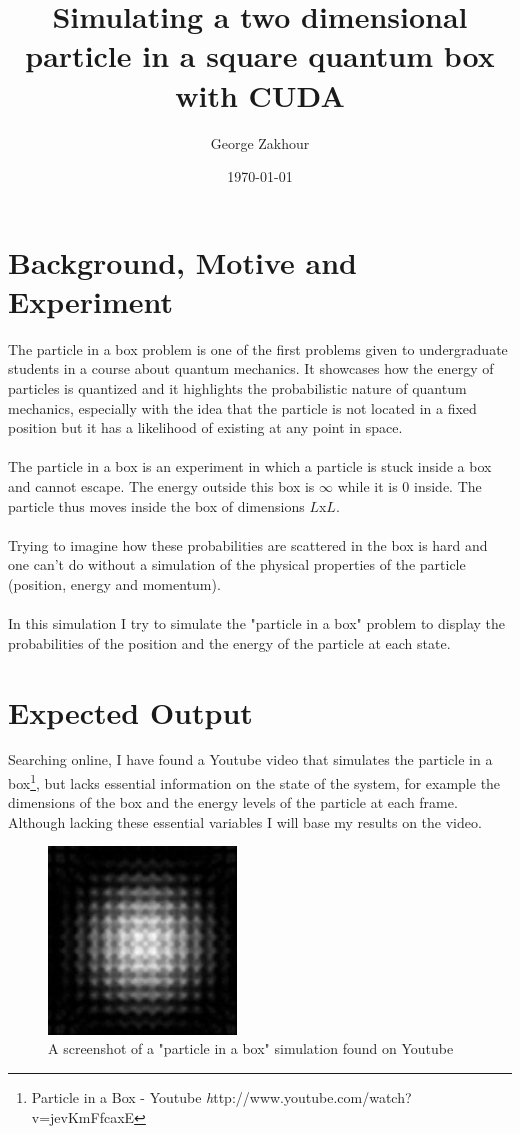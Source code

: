 \documentclass[a4paper, 10pt]{article}
\author{George Zakhour}
\title{{\bf Simulating a two dimensional particle in a square quantum box with
        CUDA}}
\date{\today}
\begin{document}
\maketitle
\newpage
\tableofcontents
\newpage

\section{Background, Motive and Experiment}
The particle in a box problem is one of the first problems given to undergraduate
students in a course about quantum mechanics. It showcases how the energy
of particles is quantized and it highlights the probabilistic nature of
quantum mechanics, especially with the idea that the particle is not located in
a fixed position but it has a likelihood of existing at any point in space.\\\\
The particle in a box is an experiment in which a particle is stuck inside a
box and cannot escape. The energy outside this box is $\infty$ while it
is $0$ inside. The particle thus moves inside the box of dimensions $L$x$L$.\\\\
Trying to imagine how these probabilities are scattered in the box is hard and one
can't do without a simulation of the physical properties of the particle
(position, energy and momentum).\\\\
In this simulation I try to simulate the "particle in a box" problem to
display the probabilities of the position and the energy of the particle at
each state.

\section{Expected Output}
Searching online, I have found a Youtube video that simulates the particle in a
box\footnote{ Particle in a Box - Youtube {\emph
http://www.youtube.com/watch?v=jevKmFfcaxE}}, but lacks essential information
on the state of the system, for example the dimensions of the box and the
energy levels of the particle at each frame. Although lacking these
essential variables I will base my results on the video.\\

\begin{figure}[hb]
    \centering
        \includegraphics[width=5cm]{graphics/online_simulation.png}
    \caption{A screenshot of a "particle in a box" simulation found on Youtube}
\end{figure}
\end{document}
